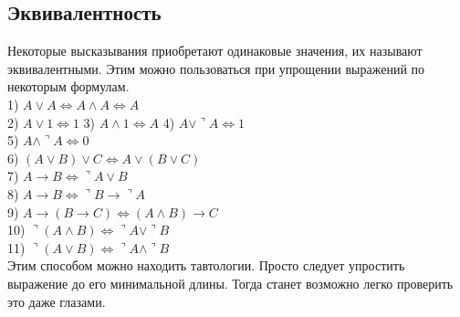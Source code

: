 \documentclass[a4paper,12pt]{article}
\begin{document}
\subsection{Эквивалентность}
Некоторые высказывания приобретают одинаковые значения, их называют эквивалентными. Этим можно пользоваться при упрощении выражений по некоторым формулам.\\
1) $A \vee A \Leftrightarrow A\wedge A \Leftrightarrow A$\\
2) $A \vee 1 \Leftrightarrow 1$
3) $A \wedge 1 \Leftrightarrow A$
4) $A \vee \urcorner A \Leftrightarrow 1$\\
5) $A \wedge \urcorner A \Leftrightarrow 0$\\
6) $(A \vee B) \vee C \Leftrightarrow A\vee(B \vee C)$\\
7) $A\rightarrow B \Leftrightarrow \urcorner A\vee B$\\
8) $A\rightarrow B \Leftrightarrow \urcorner B \rightarrow \urcorner A$\\
9) $A\rightarrow (B \rightarrow C) \Leftrightarrow (A\wedge B) \rightarrow C$\\
10) $\urcorner(A \wedge B) \Leftrightarrow \urcorner A \vee \urcorner B$\\
11) $\urcorner(A \vee B) \Leftrightarrow \urcorner A \wedge \urcorner B$\\
Этим способом можно находить тавтологии. Просто следует упростить выражение до его минимальной длины. Тогда станет возможно легко проверить это даже глазами.
\end{document}

